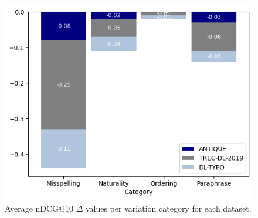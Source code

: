 \begin{figure}[ht]
    \centering
    \includegraphics[width=0.8\linewidth]{5Results/main/plot_cat_changes.png}
    \caption{Average nDCG@10 $\Delta$ values per variation category for each dataset.}
    \label{fig:cat-changes}
\end{figure}
